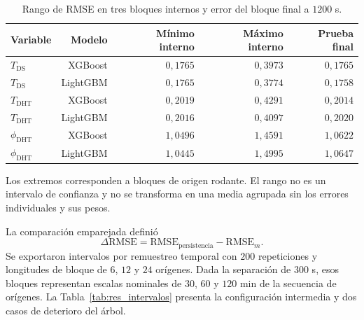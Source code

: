 \begin{table}[htbp]
\centering
\caption{Rango de RMSE en tres bloques internos y error del bloque final a $1200$ s.}
\label{tab:res_validacion_ml}
\small
\setlength{\tabcolsep}{5pt}
\begin{tabular}{lrrrr}
\toprule
Variable & Modelo & Mínimo interno & Máximo interno & Prueba final \\
\midrule
$T_{\mathrm{DS}}$ & XGBoost & $0{,}1765$ & $0{,}3973$ & $0{,}1765$ \\
$T_{\mathrm{DS}}$ & LightGBM & $0{,}1765$ & $0{,}3774$ & $0{,}1758$ \\
$T_{\mathrm{DHT}}$ & XGBoost & $0{,}2019$ & $0{,}4291$ & $0{,}2014$ \\
$T_{\mathrm{DHT}}$ & LightGBM & $0{,}2016$ & $0{,}4097$ & $0{,}2020$ \\
$\phi_{\mathrm{DHT}}$ & XGBoost & $1{,}0496$ & $1{,}4591$ & $1{,}0622$ \\
$\phi_{\mathrm{DHT}}$ & LightGBM & $1{,}0445$ & $1{,}4995$ & $1{,}0647$ \\
\bottomrule
\end{tabular}
\par\vspace{3pt}
\begin{minipage}{0.98\textwidth}\footnotesize
Los extremos corresponden a bloques de origen rodante. El rango no es un intervalo de confianza y no se transforma en una media agrupada sin los errores individuales y sus pesos.
\end{minipage}
\end{table}


La comparación emparejada definió
\begin{equation}
\Delta\mathrm{RMSE}
=\mathrm{RMSE}_{\mathrm{persistencia}}
-\mathrm{RMSE}_{m}.
\label{eq:res_mejora}
\end{equation}
Se exportaron intervalos por remuestreo temporal con $200$ repeticiones y longitudes de bloque de $6$, $12$ y $24$ orígenes. Dada la separación de $300$ s, esos bloques representan escalas nominales de $30$, $60$ y $120$ min de la secuencia de orígenes. La Tabla~\ref{tab:res_intervalos} presenta la configuración intermedia y dos casos de deterioro del árbol.


